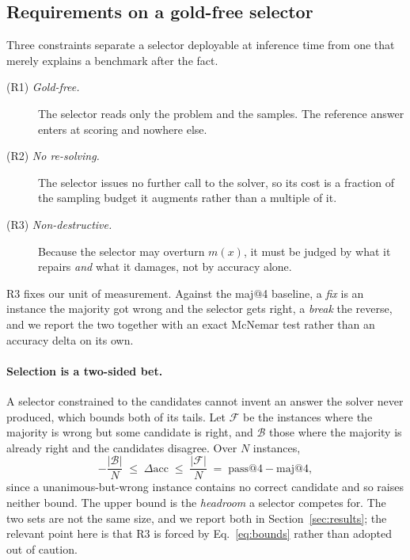 \documentclass[letterpaper]{article} %
\begin{document}
\subsection{Requirements on a gold-free selector}
\label{sec:requirements}

Three constraints separate a selector deployable at inference time from one
that merely explains a benchmark after the fact.

\begin{description}
\item[\textnormal{(R1) \emph{Gold-free.}}] The selector reads only the problem
  and the samples. The reference answer enters at scoring and nowhere else.
\item[\textnormal{(R2) \emph{No re-solving.}}] The selector issues no further
  call to the solver, so its cost is a fraction of the sampling budget it
  augments rather than a multiple of it.
\item[\textnormal{(R3) \emph{Non-destructive.}}] Because the selector may
  overturn $m(x)$, it must be judged by what it repairs \emph{and} what it
  damages, not by accuracy alone.
\end{description}

R3 fixes our unit of measurement. Against the maj@4 baseline, a \emph{fix} is
an instance the majority got wrong and the selector gets right, a \emph{break}
the reverse, and we report the two together with an exact McNemar test rather
than an accuracy delta on its own.

\paragraph{Selection is a two-sided bet.}
A selector constrained to the candidates cannot invent an answer the solver
never produced, which bounds both of its tails. Let $\mathcal{F}$ be the
instances where the majority is wrong but some candidate is right, and
$\mathcal{B}$ those where the majority is already right and the candidates
disagree. Over $N$ instances,
\begin{equation}
  -\frac{|\mathcal{B}|}{N}
  \;\le\; \Delta\mathrm{acc}
  \;\le\; \frac{|\mathcal{F}|}{N}
  \;=\; \mathrm{pass@}4 - \mathrm{maj@}4 ,
  \label{eq:bounds}
\end{equation}
since a unanimous-but-wrong instance contains no correct candidate and so
raises neither bound. The upper bound is the \emph{headroom} a selector
competes for. The two sets are not the same size, and we report both in
Section~\ref{sec:results}; the relevant point here is that R3 is forced by
Eq.~\eqref{eq:bounds} rather than adopted out of caution.
\end{document}
